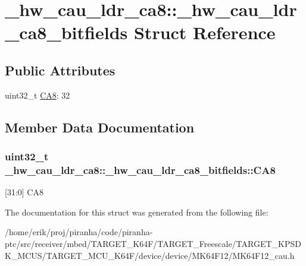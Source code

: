 \hypertarget{struct__hw__cau__ldr__ca8_1_1__hw__cau__ldr__ca8__bitfields}{}\section{\+\_\+hw\+\_\+cau\+\_\+ldr\+\_\+ca8\+:\+:\+\_\+hw\+\_\+cau\+\_\+ldr\+\_\+ca8\+\_\+bitfields Struct Reference}
\label{struct__hw__cau__ldr__ca8_1_1__hw__cau__ldr__ca8__bitfields}
\subsection*{Public Attributes}
\begin{DoxyCompactItemize}
\item 
uint32\+\_\+t \hyperlink{struct__hw__cau__ldr__ca8_1_1__hw__cau__ldr__ca8__bitfields_a917980f3ff776e12af1a452a304f4198}{C\+A8}\+: 32
\end{DoxyCompactItemize}


\subsection{Member Data Documentation}
\subsubsection[{\texorpdfstring{C\+A8}{CA8}}]{\setlength{\rightskip}{0pt plus 5cm}uint32\+\_\+t \+\_\+hw\+\_\+cau\+\_\+ldr\+\_\+ca8\+::\+\_\+hw\+\_\+cau\+\_\+ldr\+\_\+ca8\+\_\+bitfields\+::\+C\+A8}\hypertarget{struct__hw__cau__ldr__ca8_1_1__hw__cau__ldr__ca8__bitfields_a917980f3ff776e12af1a452a304f4198}{}\label{struct__hw__cau__ldr__ca8_1_1__hw__cau__ldr__ca8__bitfields_a917980f3ff776e12af1a452a304f4198}
\mbox{[}31\+:0\mbox{]} C\+A8 

The documentation for this struct was generated from the following file\+:\begin{DoxyCompactItemize}
\item 
/home/erik/proj/piranha/code/piranha-\/ptc/src/receiver/mbed/\+T\+A\+R\+G\+E\+T\+\_\+\+K64\+F/\+T\+A\+R\+G\+E\+T\+\_\+\+Freescale/\+T\+A\+R\+G\+E\+T\+\_\+\+K\+P\+S\+D\+K\+\_\+\+M\+C\+U\+S/\+T\+A\+R\+G\+E\+T\+\_\+\+M\+C\+U\+\_\+\+K64\+F/device/device/\+M\+K64\+F12/M\+K64\+F12\+\_\+cau.\+h\end{DoxyCompactItemize}
